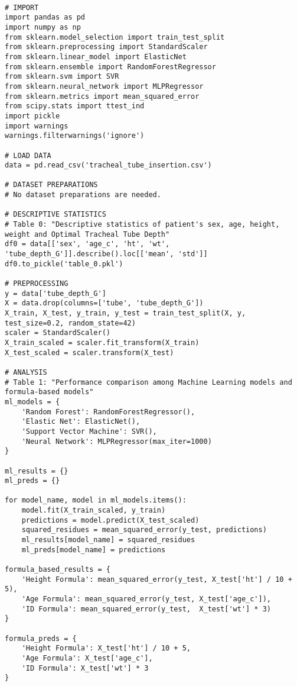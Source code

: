 \documentclass[11pt]{article}
\begin{document}
\begin{verbatim}

# IMPORT
import pandas as pd
import numpy as np
from sklearn.model_selection import train_test_split
from sklearn.preprocessing import StandardScaler
from sklearn.linear_model import ElasticNet
from sklearn.ensemble import RandomForestRegressor
from sklearn.svm import SVR
from sklearn.neural_network import MLPRegressor
from sklearn.metrics import mean_squared_error
from scipy.stats import ttest_ind
import pickle
import warnings
warnings.filterwarnings('ignore')

# LOAD DATA
data = pd.read_csv('tracheal_tube_insertion.csv')

# DATASET PREPARATIONS
# No dataset preparations are needed.

# DESCRIPTIVE STATISTICS
# Table 0: "Descriptive statistics of patient's sex, age, height, weight and Optimal Tracheal Tube Depth"
df0 = data[['sex', 'age_c', 'ht', 'wt', 'tube_depth_G']].describe().loc[['mean', 'std']]
df0.to_pickle('table_0.pkl')

# PREPROCESSING
y = data['tube_depth_G']
X = data.drop(columns=['tube', 'tube_depth_G'])
X_train, X_test, y_train, y_test = train_test_split(X, y, test_size=0.2, random_state=42)
scaler = StandardScaler()
X_train_scaled = scaler.fit_transform(X_train)
X_test_scaled = scaler.transform(X_test)

# ANALYSIS
# Table 1: "Performance comparison among Machine Learning models and formula-based models"
ml_models = {
    'Random Forest': RandomForestRegressor(),
    'Elastic Net': ElasticNet(),
    'Support Vector Machine': SVR(),
    'Neural Network': MLPRegressor(max_iter=1000)
}

ml_results = {}
ml_preds = {}

for model_name, model in ml_models.items():
    model.fit(X_train_scaled, y_train)
    predictions = model.predict(X_test_scaled)
    squared_residues = mean_squared_error(y_test, predictions)
    ml_results[model_name] = squared_residues
    ml_preds[model_name] = predictions

formula_based_results = {
    'Height Formula': mean_squared_error(y_test, X_test['ht'] / 10 + 5),
    'Age Formula': mean_squared_error(y_test, X_test['age_c']),
    'ID Formula': mean_squared_error(y_test,  X_test['wt'] * 3)
}

formula_preds = {
    'Height Formula': X_test['ht'] / 10 + 5,
    'Age Formula': X_test['age_c'],
    'ID Formula': X_test['wt'] * 3
}


\end{verbatim}
\end{document}

